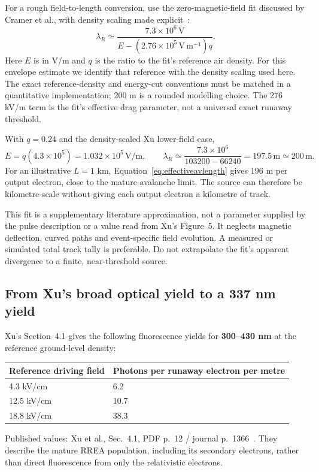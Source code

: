 \documentclass[11pt,a4paper]{article}
\newcommand{\source}[1]{{\small\color{muted}#1}\par}
\begin{document}
For a rough field-to-length conversion, use the zero-magnetic-field fit discussed by Cramer et al., with density scaling made explicit~\cite[Eq.~(3)]{Cramer2016}:
\begin{equation}
 \lambda_R\simeq
 \frac{7.3\times10^6\,\mathrm V}
 {E-(2.76\times10^5\,\mathrm{V\,m^{-1}})q}.
 \label{eq:avlengthfit}
\end{equation}
Here $E$ is in V/m and $q$ is the ratio to the fit's reference air density. For this envelope estimate we identify that reference with the density scaling used here. The exact reference-density and energy-cut conventions must be matched in a quantitative implementation; 200 m is a rounded modelling choice. The 276 kV/m term is the fit's effective drag parameter, not a universal exact runaway threshold.

With $q=0.24$ and the density-scaled Xu lower-field case,
\[
 E=q(4.3\times10^5)=1.032\times10^5\,\mathrm{V/m},
 \qquad
 \lambda_R\simeq\frac{7.3\times10^6}{103200-66240}
 =197.5\,\mathrm m\simeq200\,\mathrm m.
\]
For an illustrative $L=1$ km, Equation~\eqref{eq:effectiveavlength} gives 196 m per output electron, close to the mature-avalanche limit. The source can therefore be kilometre-scale without giving each output electron a kilometre of track.

\begin{keybox}
This fit is a supplementary literature approximation, not a parameter supplied by the pulse description or a value read from Xu's Figure~5. It neglects magnetic deflection, curved paths and event-specific field evolution. A measured or simulated total track tally is preferable. Do not extrapolate the fit's apparent divergence to a finite, near-threshold source.
\end{keybox}

\clearpage
\subsection{From Xu's broad optical yield to a 337 nm yield}
\label{sec:bandfraction}
Xu's Section~4.1 gives the following fluorescence yields for \textbf{300--430 nm} at the reference ground-level density:
\begin{center}
\begin{tabularx}{\textwidth}{@{}P{49mm}Y@{}}
\toprule
\textbf{Reference driving field} & \textbf{Photons per runaway electron per metre}\\
 kV/cm & 6.2\\
12.5 kV/cm & 10.7\\
18.8 kV/cm & 38.3\\
\bottomrule
\end{tabularx}
\end{center}
\source{Published values: Xu et al., Sec.~4.1, PDF p.~12 / journal p.~1366~\cite{Xu2015}. They describe the mature RREA population, including its secondary electrons, rather than direct fluorescence from only the relativistic electrons.}
\end{document}

